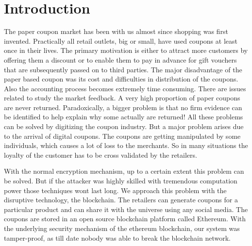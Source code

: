 \chapter{Introduction}
\par
The paper coupon market has been with us almost since shopping was first invented. Practically all retail outlets, big or small, have used coupons at least once in their lives. The primary motivation is either to attract more customers by offering them a discount or to enable them to pay in advance for gift vouchers that are subsequently passed on to third parties. The major disadvantage of the paper based coupon was its cost and difficulties in distribution of the coupons. Also the accounting process becomes extremely time consuming. There are issues related to study the market feedback.  A very high proportion of paper coupons are never returned. Paradoxically, a bigger problem is that no firm evidence can be identified to help explain why some actually are returned! All these problems can be solved by digitizing the coupon industry. But a major problem arises due to the arrival of digital coupons. The coupons are getting manipulated by some individuals, which causes a lot of loss to the merchants. So in many situations the loyalty of the customer has to be cross validated by the retailers. 

\par
With the normal encryption mechanism, up to a certain extent this problem can be solved. But if the attacker was highly skilled with tremendous computation power those techniques wont last long. We approach this problem with the disruptive technology, the blockchain. The retailers can generate coupons for a particular product and can share it with the universe using any social media. The coupons are stored in an open source blockchain platform called Ethereum. With the underlying security mechanism of the ethereum blockchain, our system was tamper-proof, as till date nobody was able to break the blockchain network.
